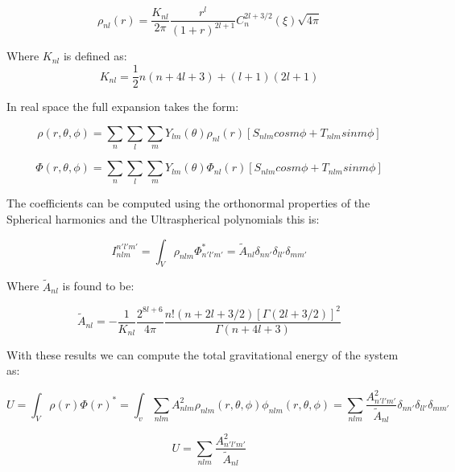 \documentclass[14pt]{article}
\begin{document}
\begin{equation}
  \rho_{nl}(r) = \dfrac{K_{nl}}{2\pi}\dfrac{r^l}{(1+r)^{2l+1}}C_{n}^{2l+3/2}(\xi)\sqrt{4\pi}
\end{equation}

Where $K_{nl}$ is defined as:
\begin{equation}
    K_{nl}=\dfrac{1}{2}n(n+4l+3) +(l+1)(2l+1)
\end{equation}

In real space the full expansion takes the form: 


\begin{equation}
  \rho(r, \theta, \phi) = \sum_{n} \sum_l \sum_m Y_{lm}(\theta) \rho_{nl}(r)
  \left[ S_{nlm} cos m\phi + T_{nlm} sin m \phi \right]
\end{equation}


\begin{equation}
  \Phi(r, \theta, \phi) = \sum_{n} \sum_l \sum_m Y_{lm}(\theta) \Phi_{nl}(r)
  \left[ S_{nlm} cos m\phi + T_{nlm} sin m \phi \right]
\end{equation}


The coefficients can be computed using the orthonormal properties of the
Spherical harmonics and the Ultraspherical polynomials this is:

\begin{equation}\label{eq:energy}
  I_{nlm}^{n'l'm'} = \int_V \rho_{nlm} \Phi_{n'l'm'}^* = \tilde{A}_{nl} \delta_{nn'}
  \delta_{ll'} \delta_{mm'} 
\end{equation}

Where $\tilde{A}_{nl}$ is found to be:

\begin{equation}
    \tilde{A}_{nl} = - \frac{1}{K_{nl}}\frac{2^{8l+6}}{4\pi}\frac{n!(n+2l+3/2)[\Gamma(2l+3/2)]^2}{\Gamma(n+4l+3)}
\end{equation}

With these results we can compute the total gravitational energy of the system
as:

\begin{equation}
  U = \int_V \rho(r)\Phi(r)^{*} = \int_v  \sum_{nlm} A_{nlm}^2 \rho_{nlm}(r,
  \theta, \phi) \phi_{nlm}(r, \theta, \phi) = \sum_{nlm}
  \frac{A_{n'l'm'}^2}{\tilde{A}_{nl}}
  \delta_{nn'}\delta_{ll'}\delta_{mm'} 
\end{equation}

\begin{equation}
  U = \sum_{nlm} \frac{A_{n'l'm'}^2}{\tilde{A}_{nl}} 
\end{equation}
\end{document}
